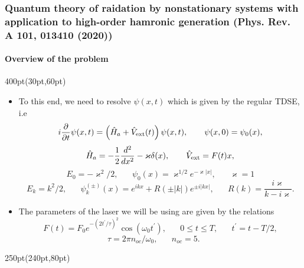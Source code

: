 \begin{frame}
\frametitle{Quantum theory of raidation by nonstationary systems 
	with application to high-order hamronic generation
        (Phys. Rev. A 101, 013410 (2020))}
        \framesubtitle{Overview of the problem}
\footnotesize
\begin{textblock*}{400pt}(30pt,60pt)
\begin{itemize}
\item To this end, we need to resolve $\psi(x,t)$ 
which is given by the regular TDSE, i.e 
\begin{equation}
	i\frac{\partial}{\partial t}\psi(x,t)
	   = \left( \hat{H}_a + \hat{V}_{\rm ext}(t)\right) 
	   \psi(x,t),   \hspace{20pt}\psi(x,0)=\psi_0(x),  \label{eqn:step_1d}
\end{equation}
\begin{equation}
  \hat{H}_a = -\frac{1}{2}\frac{d^2}{dx^2} - \varkappa\delta(x), \hspace{20pt}
  \hat{V}_{\rm ext} = F(t)x,
\end{equation}
\begin{equation}
  E_0 = -\varkappa^2/2,\hspace{20pt}
  \psi_{0}(x) = \varkappa^{1/2}e^{-\varkappa|x|}, \hspace{20pt}
  \varkappa = 1       \label{eqn:bound_state}
\end{equation}
\begin{equation}
  E_k = k^2/2,\hspace{20pt}
  \psi_k^{(\pm)}(x) = e^{ikx} + R(\pm|k|)e^{\pm i|kx|}, \hspace{20pt}
   R(k) = \frac{i\varkappa}{k-i \varkappa}. \label{eqn:inout_states}
\end{equation}
\vspace{10pt}
\item The parameters of the laser we will be using 
are given by the relations
\begin{equation}
  F(t) = F_0 e^{-(2t^\prime/\tau)^2}\cos(\omega_0 t^\prime),
\hspace{20pt}  0 \leqslant t \leqslant T,
\hspace{20pt}  t^{\prime} = t - T/2,
\end{equation}
\begin{equation}
  \tau  = 2\pi n_{oc}/\omega_0,  \hspace{20pt}
  n_{oc} = 5. \hspace{20pt}
\end{equation}
\end{itemize}

\end{textblock*}

\begin{textblock*}{250pt}(240pt,80pt)
\end{textblock*}

\end{frame}




